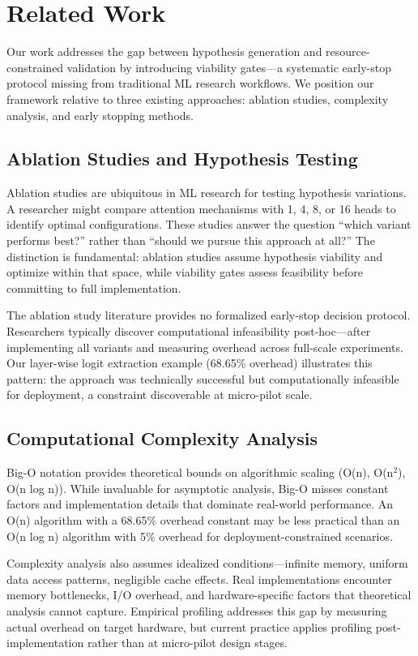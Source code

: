 \section{Related Work}

Our work addresses the gap between hypothesis generation and resource-constrained validation by introducing viability gates---a systematic early-stop protocol missing from traditional ML research workflows. We position our framework relative to three existing approaches: ablation studies, complexity analysis, and early stopping methods.

\subsection{Ablation Studies and Hypothesis Testing}

Ablation studies are ubiquitous in ML research for testing hypothesis variations. A researcher might compare attention mechanisms with 1, 4, 8, or 16 heads to identify optimal configurations. These studies answer the question ``which variant performs best?'' rather than ``should we pursue this approach at all?'' The distinction is fundamental: ablation studies assume hypothesis viability and optimize within that space, while viability gates assess feasibility before committing to full implementation.

The ablation study literature provides no formalized early-stop decision protocol. Researchers typically discover computational infeasibility post-hoc---after implementing all variants and measuring overhead across full-scale experiments. Our layer-wise logit extraction example (68.65\% overhead) illustrates this pattern: the approach was technically successful but computationally infeasible for deployment, a constraint discoverable at micro-pilot scale.

\subsection{Computational Complexity Analysis}

Big-O notation provides theoretical bounds on algorithmic scaling (O(n), O(n$^2$), O(n log n)). While invaluable for asymptotic analysis, Big-O misses constant factors and implementation details that dominate real-world performance. An O(n) algorithm with a 68.65\% overhead constant may be less practical than an O(n log n) algorithm with 5\% overhead for deployment-constrained scenarios.

Complexity analysis also assumes idealized conditions---infinite memory, uniform data access patterns, negligible cache effects. Real implementations encounter memory bottlenecks, I/O overhead, and hardware-specific factors that theoretical analysis cannot capture. Empirical profiling addresses this gap by measuring actual overhead on target hardware, but current practice applies profiling post-implementation rather than at micro-pilot design stages.

